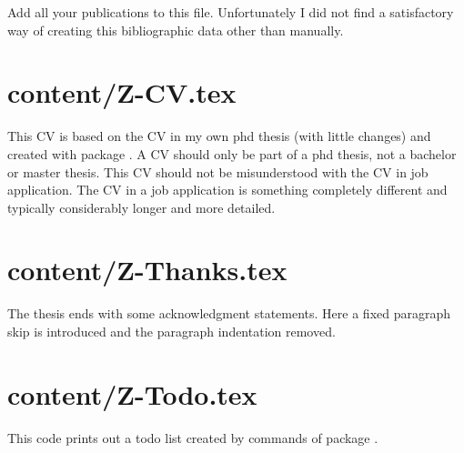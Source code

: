 Add all your publications to this file. Unfortunately I did not find a satisfactory way of creating this bibliographic data other than manually.


\section{content/Z-CV.tex}

This CV is based on the CV in my own phd thesis (with little changes) and created with package . A CV should only be part of a phd thesis, not a bachelor or master thesis. This CV should not be misunderstood with the CV in job application. The CV in a job application is something completely different and typically considerably longer and more detailed.


\section{content/Z-Thanks.tex}

The thesis ends with some acknowledgment statements. Here a fixed paragraph skip is introduced and the paragraph indentation removed.


\section{content/Z-Todo.tex}

This code prints out a todo list created by commands of package .


